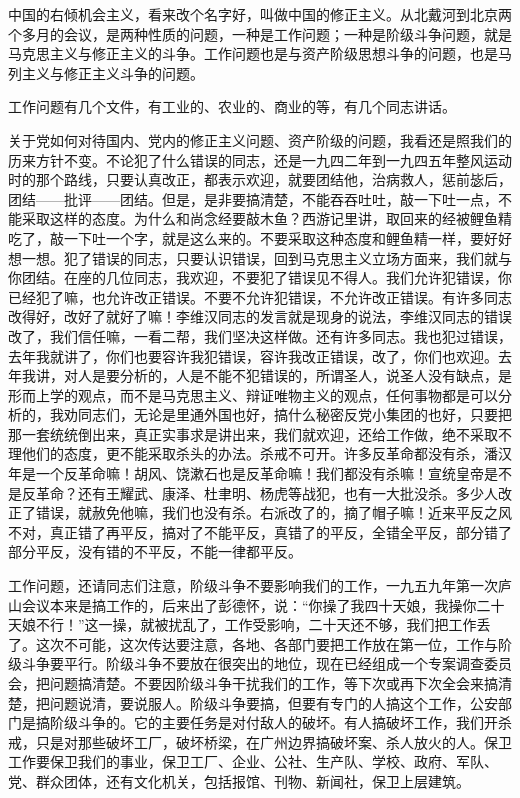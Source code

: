 中国的右倾机会主义，看来改个名字好，叫做中国的修正主义。从北戴河到北京两个多月的会议，是两种性质的问题，一种是工作问题；一种是阶级斗争问题，就是马克思主义与修正主义的斗争。工作问题也是与资产阶级思想斗争的问题，也是马列主义与修正主义斗争的问题。

工作问题有几个文件，有工业的、农业的、商业的等，有几个同志讲话。

关于党如何对待国内、党内的修正主义问题、资产阶级的问题，我看还是照我们的历来方针不变。不论犯了什么错误的同志，还是一九四二年到一九四五年整风运动时的那个路线，只要认真改正，都表示欢迎，就要团结他，治病救人，惩前毖后，团结——批评——团结。但是，是非要搞清楚，不能吞吞吐吐，敲一下吐一点，不能采取这样的态度。为什么和尚念经要敲木鱼？西游记里讲，取回来的经被鲤鱼精吃了，敲一下吐一个字，就是这么来的。不要采取这种态度和鲤鱼精一样，要好好想一想。犯了错误的同志，只要认识错误，回到马克思主义立场方面来，我们就与你团结。在座的几位同志，我欢迎，不要犯了错误见不得人。我们允许犯错误，你已经犯了嘛，也允许改正错误。不要不允许犯错误，不允许改正错误。有许多同志改得好，改好了就好了嘛！李维汉同志的发言就是现身的说法，李维汉同志的错误改了，我们信任嘛，一看二帮，我们坚决这样做。还有许多同志。我也犯过错误，去年我就讲了，你们也要容许我犯错误，容许我改正错误，改了，你们也欢迎。去年我讲，对人是要分析的，人是不能不犯错误的，所谓圣人，说圣人没有缺点，是形而上学的观点，而不是马克思主义、辩证唯物主义的观点，任何事物都是可以分析的，我劝同志们，无论是里通外国也好，搞什么秘密反党小集团的也好，只要把那一套统统倒出来，真正实事求是讲出来，我们就欢迎，还给工作做，绝不采取不理他们的态度，更不能采取杀头的办法。杀戒不可开。许多反革命都没有杀，潘汉年是一个反革命嘛！胡风、饶漱石也是反革命嘛！我们都没有杀嘛！宣统皇帝是不是反革命？还有王耀武、康泽、杜聿明、杨虎等战犯，也有一大批没杀。多少人改正了错误，就赦免他嘛，我们也没有杀。右派改了的，摘了帽子嘛！近来平反之风不对，真正错了再平反，搞对了不能平反，真错了的平反，全错全平反，部分错了部分平反，没有错的不平反，不能一律都平反。

工作问题，还请同志们注意，阶级斗争不要影响我们的工作，一九五九年第一次庐山会议本来是搞工作的，后来出了彭德怀，说：“你操了我四十天娘，我操你二十天娘不行！”这一操，就被扰乱了，工作受影响，二十天还不够，我们把工作丢了。这次不可能，这次传达要注意，各地、各部门要把工作放在第一位，工作与阶级斗争要平行。阶级斗争不要放在很突出的地位，现在已经组成一个专案调查委员会，把问题搞清楚。不要因阶级斗争干扰我们的工作，等下次或再下次全会来搞清楚，把问题说清，要说服人。阶级斗争要搞，但要有专门的人搞这个工作，公安部门是搞阶级斗争的。它的主要任务是对付敌人的破坏。有人搞破坏工作，我们开杀戒，只是对那些破坏工厂，破坏桥梁，在广州边界搞破坏案、杀人放火的人。保卫工作要保卫我们的事业，保卫工厂、企业、公社、生产队、学校、政府、军队、党、群众团体，还有文化机关，包括报馆、刊物、新闻社，保卫上层建筑。

